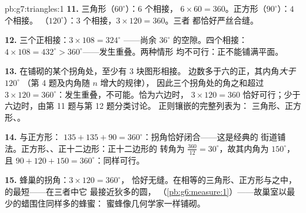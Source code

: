 \begin{solution}{pb:g7:triangles:1}
\textbf{11.} 三角形（$60^\circ$）：$6$ 个相接，
$6 \times 60 = 360$。正方形（$90^\circ$）：$4$ 个相接。
（$120^\circ$）：$3$ 个相接，$3 \times 120 = 360$。三者
都恰好严丝合缝。

\textbf{12.} 三个正相接：$3 \times 108 = 324^\circ$
——尚余 $36^\circ$ 的空隙。四个相接：
$4 \times 108 = 432^\circ > 360^\circ$——发生重叠。两种情形
均不可行：正不能铺满平面。

\textbf{13.} 在铺砌的某个拐角处，至少有 $3$ 块图形相接。
边数多于六的正，其内角\emph{大于} $120^\circ$
（第 4 题及内角随 $n$ 增大的规律），
因此三个拐角处的角之和超过
$3 \times 120 = 360^\circ$：发生重叠，不可能。恰为六边时，
$3 \times 120 = 360$ 恰好可行；少于六边时，由第 11 题与第 12 题分类讨论。
正则镶嵌的完整列表为：
三角形、正方形、。

\textbf{14.} 与正方形：
$135 + 135 + 90 = 360^\circ$：拐角恰好闭合——这是经典的
街道铺法。正方形、、正十二边形：正十二边形的
转角为 $\frac{360}{12} = 30^\circ$，故其内角为
$150^\circ$，且 $90 + 120 + 150 = 360^\circ$：同样可行。

\textbf{15.} 蜂巢的拐角：$3 \times 120 = 360^\circ$，
恰好无缝。在相等的三角形、正方形与之中，
的最短——在三者中它
最接近狄多的圆，
（\cref{pb:g6:measure:1}）——故巢室以最少的蜡围住同样多的蜂蜜：
蜜蜂像几何学家一样铺砌。
\end{solution}
